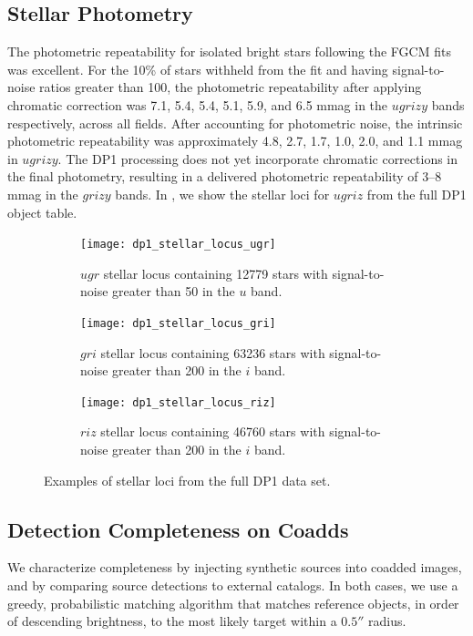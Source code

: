 \subsection{Stellar Photometry}
The photometric repeatability for isolated bright stars following the \gls{FGCM} fits was excellent. 
For the 10\% of stars withheld from the fit and having signal-to-noise ratios greater than 100, the photometric repeatability 
after applying chromatic correction was 7.1, 5.4, 5.4, 5.1, 5.9, and 6.5  mmag in the $ugrizy$ bands respectively, across all fields.
After accounting for photometric noise, the intrinsic photometric repeatability was approximately 4.8, 2.7, 1.7, 1.0, 2.0, and 1.1 mmag in $ugrizy$.
The DP1 processing does not yet incorporate chromatic corrections in the final photometry, resulting in a delivered photometric repeatability of 3--8 mmag in the $grizy$ bands.
In , we show the stellar loci for $ugriz$ from the full DP1 object table.
\begin{figure}[hbt!]
  \centering
  \begin{subfigure}[t]{0.31\textwidth}
  \texttt{[image: dp1\_stellar\_locus\_ugr]}
  \caption{$ugr$ stellar locus containing 12779 stars with signal-to-noise greater than 50 in the $u$ band.}
  \end{subfigure}\hfill
  \begin{subfigure}[t]{0.31\textwidth}
  \texttt{[image: dp1\_stellar\_locus\_gri]}
  \caption{$gri$ stellar locus containing 63236 stars with signal-to-noise greater than 200 in the $i$ band.}
  \end{subfigure}\hfill
    \begin{subfigure}[t]{0.31\textwidth}
  \texttt{[image: dp1\_stellar\_locus\_riz]}
  \caption{$riz$ stellar locus containing 46760 stars with signal-to-noise greater than 200 in the $i$ band.}
  \end{subfigure}\hfill
\caption{Examples of stellar loci from the full DP1 data set.}
  \label{fig:stellarloci}
\end{figure}

\subsection{Detection Completeness on Coadds}
\label{ssec:detection_completeness}
We characterize completeness by injecting synthetic sources into coadded images, and by comparing source detections to external catalogs.
In both cases, we use a greedy, probabilistic matching \gls{algorithm} that matches reference objects, in order of descending brightness, to the most likely target within a $0.5''$ radius.

